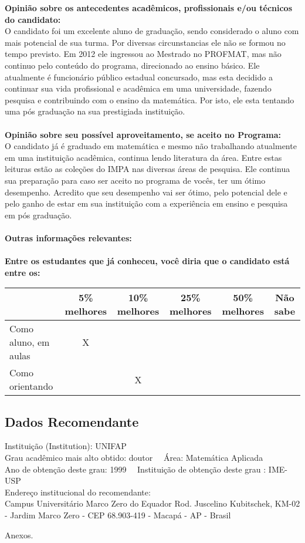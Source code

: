 \documentclass[11pt]{article}
\begin{document}
\textbf{Opinião sobre os antecedentes acadêmicos, profissionais e/ou técnicos do candidato:}
\\O candidato foi um excelente aluno de graduação, sendo considerado o aluno com mais potencial de sua turma. Por diversas circunstancias ele não se formou no tempo previsto. Em 2012 ele ingressou ao Mestrado no PROFMAT, mas não continuo pelo conteúdo do programa, direcionado ao ensino básico. 
Ele atualmente é funcionário público estadual concursado, mas esta decidido a continuar sua vida profissional e acadêmica em uma universidade, fazendo pesquisa e contribuindo com o ensino da matemática. 
Por isto, ele esta tentando uma pós graduação na sua prestigiada instituição.\\
\\
\textbf{Opinião sobre seu possível aproveitamento, se aceito no Programa:}
\\O candidato já é graduado em matemática e mesmo não trabalhando atualmente em uma instituição acadêmica, continua lendo literatura da área. Entre estas leituras estão as coleções do IMPA nas diversas áreas de pesquisa. 
Ele continua sua preparação para caso ser aceito no programa de vocês, ter um ótimo desempenho. Acredito que seu desempenho vai ser ótimo, pelo potencial dele e pelo ganho de estar em sua instituição com a experiência em ensino e pesquisa em pós graduação.\\ 
\\
\textbf{Outras informações relevantes:} \\
\\[0.3cm]
\textbf{Entre os estudantes que já conheceu, você diria que o candidato está entre os:}
\\
\begin{tabular}{|l|c|c|c|c|c|}
\hline
 & 5\% melhores & 10\% melhores & 25\% melhores & 50\% melhores & Não sabe \\
\hline
Como aluno, em aulas & X &  &  &  & \\
\hline
Como orientando &  & X &  &  & \\
\hline
\end{tabular}
\subsection*{Dados Recomendante} 
	Instituição (Institution): UNIFAP
\\ 
	Grau acadêmico mais alto obtido: doutor
	\ \ Área: Matemática Aplicada
	\\
	Ano de obtenção deste grau: 1999
	\ \ 
	Instituição de obtenção deste grau : IME-USP
	\\ 
	Endereço institucional do recomendante: \\ Campus Universitário Marco Zero do Equador
Rod. Juscelino Kubitschek, KM-02 - Jardim Marco Zero - CEP 68.903-419 - Macapá - AP - Brasil 
\begin{center}
Anexos.
\end{center}
\end{document}
